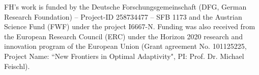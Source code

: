 \begin{acknowledgements}
FH's work is funded by the Deutsche Forschungsgemeinschaft (DFG, German Research Foundation) – Project-ID 258734477 – SFB 1173 and the Austrian Science Fund (FWF) under the project I6667-N. 
Funding was also received from the European Research Council (ERC) under the Horizon 2020 research and innovation program 
of the European Union (Grant agreement No. 101125225, Project Name: ``New Frontiers in Optimal Adaptivity", PI: Prof. Dr. Michael Feischl).
\end{acknowledgements}


 





